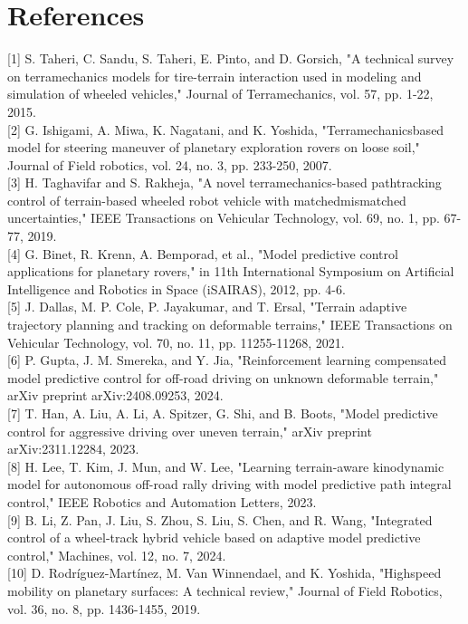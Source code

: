 \documentclass[10pt]{article}
\begin{document}
\section*{References}
[1] S. Taheri, C. Sandu, S. Taheri, E. Pinto, and D. Gorsich, "A technical survey on terramechanics models for tire-terrain interaction used in modeling and simulation of wheeled vehicles," Journal of Terramechanics, vol. 57, pp. 1-22, 2015.\\[0pt]
[2] G. Ishigami, A. Miwa, K. Nagatani, and K. Yoshida, "Terramechanicsbased model for steering maneuver of planetary exploration rovers on loose soil," Journal of Field robotics, vol. 24, no. 3, pp. 233-250, 2007.\\[0pt]
[3] H. Taghavifar and S. Rakheja, "A novel terramechanics-based pathtracking control of terrain-based wheeled robot vehicle with matchedmismatched uncertainties," IEEE Transactions on Vehicular Technology, vol. 69, no. 1, pp. 67-77, 2019.\\[0pt]
[4] G. Binet, R. Krenn, A. Bemporad, et al., "Model predictive control applications for planetary rovers," in 11th International Symposium on Artificial Intelligence and Robotics in Space (iSAIRAS), 2012, pp. 4-6.\\[0pt]
[5] J. Dallas, M. P. Cole, P. Jayakumar, and T. Ersal, "Terrain adaptive trajectory planning and tracking on deformable terrains," IEEE Transactions on Vehicular Technology, vol. 70, no. 11, pp. 11255-11268, 2021.\\[0pt]
[6] P. Gupta, J. M. Smereka, and Y. Jia, "Reinforcement learning compensated model predictive control for off-road driving on unknown deformable terrain," arXiv preprint arXiv:2408.09253, 2024.\\[0pt]
[7] T. Han, A. Liu, A. Li, A. Spitzer, G. Shi, and B. Boots, "Model predictive control for aggressive driving over uneven terrain," arXiv preprint arXiv:2311.12284, 2023.\\[0pt]
[8] H. Lee, T. Kim, J. Mun, and W. Lee, "Learning terrain-aware kinodynamic model for autonomous off-road rally driving with model predictive path integral control," IEEE Robotics and Automation Letters, 2023.\\[0pt]
[9] B. Li, Z. Pan, J. Liu, S. Zhou, S. Liu, S. Chen, and R. Wang, "Integrated control of a wheel-track hybrid vehicle based on adaptive model predictive control," Machines, vol. 12, no. 7, 2024.\\[0pt]
[10] D. Rodríguez-Martínez, M. Van Winnendael, and K. Yoshida, "Highspeed mobility on planetary surfaces: A technical review," Journal of Field Robotics, vol. 36, no. 8, pp. 1436-1455, 2019.\\[0pt]
\end{document}
